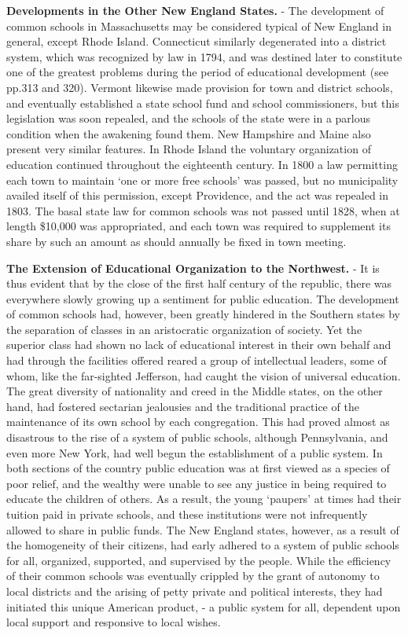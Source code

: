 \documentclass[]{book}
\begin{document}
\textbf{Developments in the Other New England States.} - The development of common schools in Massachusetts may be considered typical of New England in general, except Rhode Island. Connecticut similarly degenerated into a district system, which was recognized by law in 1794, and was destined later to constitute one of the greatest problems during the period of educational development (see pp.313 and 320). Vermont likewise made provision for town and district schools, and eventually established a state school fund and school commissioners, but this legislation was soon repealed, and the schools of the state were in a parlous condition when the awakening found them. New Hampshire and Maine also present very similar features. In Rhode Island the voluntary organization of education continued throughout the eighteenth century. In 1800 a law permitting each town to maintain `one or more free schools' was passed, but no municipality availed itself of this permission, except Providence, and the act was repealed in 1803. The basal state law for common schools was not passed until 1828, when at length \$10,000 was appropriated, and each town was required to supplement its share by such an amount as should annually be fixed in town meeting.

\textbf{The Extension of Educational Organization to the Northwest.} - It is thus evident that by the close of the first half century of the republic, there was everywhere slowly growing up a sentiment for public education. The development of common schools had, however, been greatly hindered in the Southern states by the separation of classes in an aristocratic organization of society. Yet the superior class had shown no lack of educational interest in their own behalf and had through the facilities offered reared a group of intellectual leaders, some of whom, like the far-sighted Jefferson, had caught the vision of universal education. The great diversity of nationality and creed in the Middle states, on the other hand, had fostered sectarian jealousies and the traditional practice of the maintenance of its own school by each congregation. This had proved almost as disastrous to the rise of a system of public schools, although Pennsylvania, and even more New York, had well begun the establishment of a public system. In both sections of the country public education was at first viewed as a species of poor relief, and the wealthy were unable to see any justice in being required to educate the children of others. As a result, the young `paupers' at times had their tuition paid in private schools, and these institutions were not infrequently allowed to share in public funds. The New England states, however, as a result of the homogeneity of their citizens, had early adhered to a system of public schools for all, organized, supported, and supervised by the people. While the efficiency of their common schools was eventually crippled by the grant of autonomy to local districts and the arising of petty private and political interests, they had initiated this unique American product, - a public system for all, dependent upon local support and responsive to local wishes.
\end{document}
